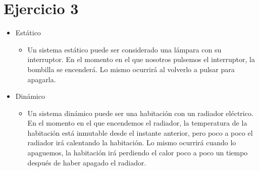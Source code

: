 \documentclass[12pt]{article}
\begin{document}
\section{Ejercicio 3}
\begin{itemize}
    \item Estático
        \begin{itemize}
            \item Un sistema estático puede ser considerado una lámpara con su interruptor. En el
            momento en el que nosotros pulsemos el interruptor, la bombilla se encenderá. Lo mismo
            ocurrirá al volverlo a pulsar para apagarla.
        \end{itemize}
    \item Dinámico
        \begin{itemize}
            \item Un sistema dinámico puede ser una habitación con un radiador eléctrico. En el momento
            en el que encendemos el radiador, la temperatura de la habitación está inmutable desde
            el instante anterior, pero poco a poco el radiador irá calentando la habitación. Lo mismo
            ocurrirá cuando lo apaguemos, la habitación irá perdiendo el calor poco a poco un tiempo
            después de haber apagado el radiador.
        \end{itemize}
\end{itemize}
\newpage
\end{document}
